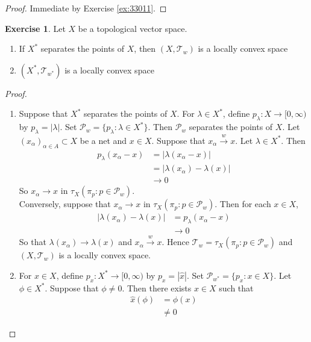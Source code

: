 \documentclass[12pt]{amsart}
\theoremstyle{definition}
\newtheorem{ex}[definition]{Exercise}
\newcommand{\al}{\alpha}
\newcommand{\lam}{\lambda}
\newcommand{\MP}{\mathcal{P}}
\newcommand{\MT}{\mathcal{T}}
\newcommand{\Rg}{[0,\infty)}
\newcommand{\conv}[1]{\xrightarrow{#1}}
\DeclareMathOperator*{\0}{\mbf{0}}
\DeclareMathOperator*{\1}{\mbf{1}}
\newcommand{\rex}[1]{Exercise \ref{ex:#1}}
\begin{document}
	\begin{proof}
		Immediate by \rex{33011}.
	\end{proof}
	
	\begin{ex}
		Let $X$ be a topological vector space. 
		\begin{enumerate}
			\item If $X^*$ separates the points of $X$, then  $(X, \MT_w)$ is a locally convex space 
			\item $(X^*, \MT_{w^*})$ is a locally convex space 
		\end{enumerate}
	\end{ex}
	
	\begin{proof}\
		\begin{enumerate}
			\item Suppose that $X^*$ separates the points of $X$. For $\lam \in X^*$, define $p_{\lam}:X \rightarrow \Rg$ by $p_{\lam} = |\lam|$. Set $\MP_{w} = \{p_{\lam}: \lam \in X^*\}$. Then $\MP_{w}$ separates the points of $X$. Let $(x_{\al})_{\al \in A} \subset X$ be a net and $x \in X$. Suppose that $x_{\al} \conv{w} x$. Let $\lam \in X^*$. Then 
			\begin{align*}
				p_{\lam}(x_{\al} - x) 
				&= |\lam(x_{\al} - x)| \\
				&= |\lam(x_{\al}) - \lam(x)| \\
				& \rightarrow 0
			\end{align*}
			So $x_{\al} \rightarrow x$ in $\tau_X(\pi_p: p \in \MP_w)$. \\
			Conversely, suppose that $x_{\al} \rightarrow x$ in $\tau_X(\pi_p: p \in \MP_w)$. Then for each $x \in X$,
			\begin{align*}
				|\lam(x_{\al}) - \lam(x)|
				&= p_{\lam}(x_{\al} - x) \\
				& \rightarrow 0
			\end{align*}
			So that $\lam(x_{\al}) \rightarrow \lam(x)$ and $x_{\al} \conv{w} x$. Hence $\MT_{w} = \tau_{X}(\pi_p: p \in \MP_{w})$ and $(X, \MT_{w})$ is a locally convex space.  \\
			\item For $x \in X$, define $p_x:X^* \rightarrow \Rg$ by $p_x = |\hat{x}|$. Set $\MP_{w^*} = \{p_x:x \in X\}$. Let $\phi \in X^*$. Suppose that $\phi \neq 0$. Then there exists $x \in X$ such that 
			\begin{align*}
				\hat{x}(\phi)
				& = \phi(x)  \\
				& \neq 0
			\end{align*}

\end{enumerate}
\end{proof}
\end{document}
